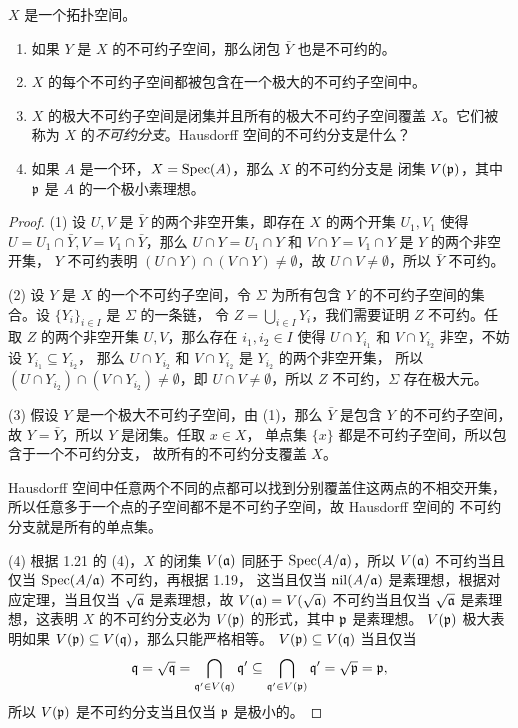 \begin{problem}
  $X$ 是一个拓扑空间。
  \begin{enumerate}
    \item 如果 $Y$ 是 $X$ 的不可约子空间，那么闭包 $\bar{Y}$ 也是不可约的。
    \item $X$ 的每个不可约子空间都被包含在一个极大的不可约子空间中。
    \item $X$ 的极大不可约子空间是闭集并且所有的极大不可约子空间覆盖 $X$。它们被称为 $X$
    的\emph{不可约分支}。Hausdorff 空间的不可约分支是什么？
    \item 如果 $A$ 是一个环，$X=\operatorname{Spec}(A)$，那么 $X$ 的不可约分支是
    闭集 $V(\mathfrak{p})$，其中 $\mathfrak{p}$ 是 $A$ 的一个极小素理想。
  \end{enumerate}
\end{problem}
\begin{proof}
  (1) 设 $U,V$ 是 $\bar{Y}$ 的两个非空开集，即存在 $X$ 的两个开集
  $U_1,V_1$ 使得 $U=U_1\cap \bar{Y},V=V_1\cap\bar{Y}$，那么
  $U\cap Y=U_1\cap Y$ 和 $V\cap Y=V_1\cap Y$ 是 $Y$ 的两个非空开集，
  $Y$ 不可约表明 $(U\cap Y)\cap (V\cap Y)\neq\emptyset$，故
  $U\cap V\neq\emptyset$，所以 $\bar{Y}$ 不可约。

  (2) 设 $Y$ 是 $X$ 的一个不可约子空间，令 $\Sigma$ 为所有包含 $Y$
  的不可约子空间的集合。设 $\{Y_i\}_{i\in I}$ 是 $\Sigma$ 的一条链，
  令 $Z=\bigcup_{i\in I}Y_i$，我们需要证明 $Z$ 不可约。任取
  $Z$ 的两个非空开集 $U,V$，那么存在 $i_1,i_2\in I$ 使得
  $U\cap Y_{i_1}$ 和 $V\cap Y_{i_2}$ 非空，不妨设 $Y_{i_1}\subseteq Y_{i_2}$，
  那么 $U\cap Y_{i_2}$ 和 $V\cap Y_{i_2}$ 是 $Y_{i_2}$ 的两个非空开集，
  所以 $(U\cap Y_{i_2})\cap (V\cap Y_{i_2})\neq\emptyset$，即
  $U\cap V\neq\emptyset$，所以 $Z$ 不可约，$\Sigma$ 存在极大元。

  (3) 假设 $Y$ 是一个极大不可约子空间，由 (1)，那么 $\bar{Y}$ 是包含 $Y$
  的不可约子空间，故 $Y=\bar{Y}$，所以 $Y$ 是闭集。任取 $x\in X$，
  单点集 $\{x\}$ 都是不可约子空间，所以包含于一个不可约分支，
  故所有的不可约分支覆盖 $X$。

  Hausdorff 空间中任意两个不同的点都可以找到分别覆盖住这两点的不相交开集，
  所以任意多于一个点的子空间都不是不可约子空间，故 Hausdorff 空间的
  不可约分支就是所有的单点集。

  (4) 根据 1.21 的 (4)，$X$ 的闭集 $V(\mathfrak{a})$ 同胚于 $\operatorname{Spec}(A/\mathfrak{a})$，所以
  $V(\mathfrak{a})$ 不可约当且仅当 $\operatorname{Spec}(A/\mathfrak{a})$ 不可约，再根据 1.19，
  这当且仅当 $\operatorname{nil}(A/\mathfrak{a})$ 是素理想，根据对应定理，当且仅当 $\sqrt{\mathfrak{a}}$
  是素理想，故 $V(\mathfrak{a})=V(\sqrt{\mathfrak{a}})$ 不可约当且仅当 $\sqrt{\mathfrak{a}}$
  是素理想，这表明 $X$ 的不可约分支必为 $V(\mathfrak{p})$ 的形式，其中 $\mathfrak{p}$ 是素理想。
  $V(\mathfrak{p})$ 极大表明如果 $V(\mathfrak{p})\subseteq V(\mathfrak{q})$，那么只能严格相等。
  $V(\mathfrak{p})\subseteq V(\mathfrak{q})$ 当且仅当
  \[
    \mathfrak{q}=\sqrt{\mathfrak{q}}=\bigcap_{\mathfrak{q}'\in V(\mathfrak{q})}\mathfrak{q}'
    \subseteq  \bigcap_{\mathfrak{q}'\in V(\mathfrak{p})}\mathfrak{q}'=\sqrt{\mathfrak{p}}=\mathfrak{p},
  \]
  所以 $V(\mathfrak{p})$ 是不可约分支当且仅当 $\mathfrak{p}$ 是极小的。
\end{proof}

